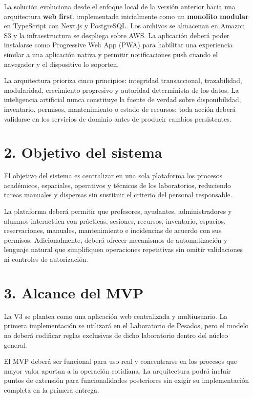 \documentclass[12pt]{article}
\begin{document}
La solución evoluciona desde el enfoque local de la versión anterior hacia una arquitectura \textbf{web first}, implementada inicialmente como un \textbf{monolito modular} en TypeScript con Next.js y PostgreSQL. Los archivos se almacenan en Amazon S3 y la infraestructura se despliega sobre AWS. La aplicación deberá poder instalarse como Progressive Web App (PWA) para habilitar una experiencia similar a una aplicación nativa y permitir notificaciones push cuando el navegador y el dispositivo lo soporten.

La arquitectura prioriza cinco principios: integridad transaccional, trazabilidad, modularidad, crecimiento progresivo y autoridad determinista de los datos. La inteligencia artificial nunca constituye la fuente de verdad sobre disponibilidad, inventario, permisos, mantenimiento o estado de recursos; toda acción deberá validarse en los servicios de dominio antes de producir cambios persistentes.

\section*{2. Objetivo del sistema}

El objetivo del sistema es centralizar en una sola plataforma los procesos académicos, espaciales, operativos y técnicos de los laboratorios, reduciendo tareas manuales y dispersas sin sustituir el criterio del personal responsable.

La plataforma deberá permitir que profesores, ayudantes, administradores y alumnos interactúen con prácticas, sesiones, recursos, inventario, espacios, reservaciones, manuales, mantenimiento e incidencias de acuerdo con sus permisos. Adicionalmente, deberá ofrecer mecanismos de automatización y lenguaje natural que simplifiquen operaciones repetitivas sin omitir validaciones ni controles de autorización.

\section*{3. Alcance del MVP}

La V3 se plantea como una aplicación web centralizada y multiusuario. La primera implementación se utilizará en el Laboratorio de Pesados, pero el modelo no deberá codificar reglas exclusivas de dicho laboratorio dentro del núcleo general.

El MVP deberá ser funcional para uso real y concentrarse en los procesos que mayor valor aportan a la operación cotidiana. La arquitectura podrá incluir puntos de extensión para funcionalidades posteriores sin exigir su implementación completa en la primera entrega.
\end{document}
